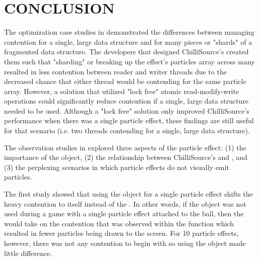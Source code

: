 
\chapter{CONCLUSION}\label{ch:conclusion}

The optimization case studies in  demonstrated the differences between managing contention for a single, large data structure and for many pieces or "shards" of a fragmented data structure. The developers that designed ChilliSource's  created them such that "sharding" or breaking up the effect's particles array across many  resulted in less contention between reader and writer threads due to the decreased chance that either thread would be contending for the same particle array. However, a solution that utilized "lock free" atomic read-modify-write operations could significantly reduce contention if a single, large data structure needed to be used. Although a "lock free" solution only improved ChilliSource's performance when there was a single particle effect, these findings are still useful for that scenario (i.e. two threads contending for a single, large data structure).

The observation studies in  explored three aspects of the particle effect: (1) the importance of the  object, (2) the relationship between ChilliSource's  and , and (3) the perplexing scenarios in which particle effects do not visually emit particles. 

The first study showed that using the  object for a single particle effect shifts the heavy contention to itself instead of the . In other words, if the  object was not used during a game with a single particle effect attached to the ball, then the  would take on the contention that was observed within the  function which resulted in fewer particles being drawn to the screen. For 10 particle effects, however, there was not any contention to begin with so using the  object made little difference.

